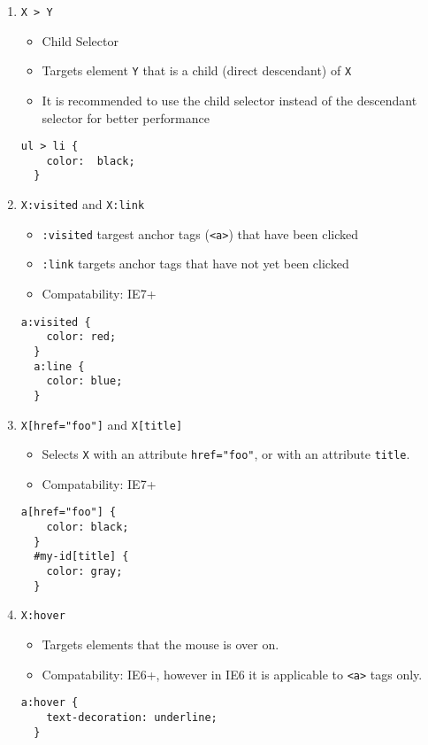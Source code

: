 \documentclass[10pt, twocolumn]{article}
\begin{document}
\begin{enumerate}
\item {\texttt{X > Y}}
  \begin{itemize}
    \item Child Selector
    \item Targets element \texttt{Y} that is a child (direct descendant) of \texttt{X}
    \item It is recommended to use the child selector instead of the descendant selector for better performance
  \end{itemize}
  \begin{lstlisting}[frame=single]
  ul > li {
    color:  black;
  }
  \end{lstlisting}  

\item {\texttt{X:visited} and \texttt{X:link}}
  \begin{itemize}
    \item \texttt{:visited} targest anchor tags (\texttt{<a>}) that have been clicked
    \item \texttt{:link} targets anchor tags that have not yet been clicked
    \item Compatability: IE7+
  \end{itemize}
  \begin{lstlisting}[frame=single]
  a:visited {
    color: red;
  }
  a:line {
    color: blue;
  }
  \end{lstlisting}

\item {\texttt{X[href="foo"]} and \texttt{X[title]}}
  \begin{itemize}
    \item Selects \texttt{X} with an attribute \texttt{href="foo"}, or with an attribute \texttt{title}.
    \item Compatability: IE7+
  \end{itemize}
  \begin{lstlisting}[frame=single]
  a[href="foo"] {
    color: black;
  }
  #my-id[title] {
    color: gray;
  }
  \end{lstlisting}

\item {\texttt{X:hover}}
  \begin{itemize}
    \item Targets elements that the mouse is over on.
    \item Compatability: IE6+, however in IE6 it is applicable to \texttt{<a>} tags only.
  \end{itemize}
  \begin{lstlisting}[frame=single]
  a:hover {
    text-decoration: underline;
  }
  \end{lstlisting}


\end{enumerate}
\end{document}
